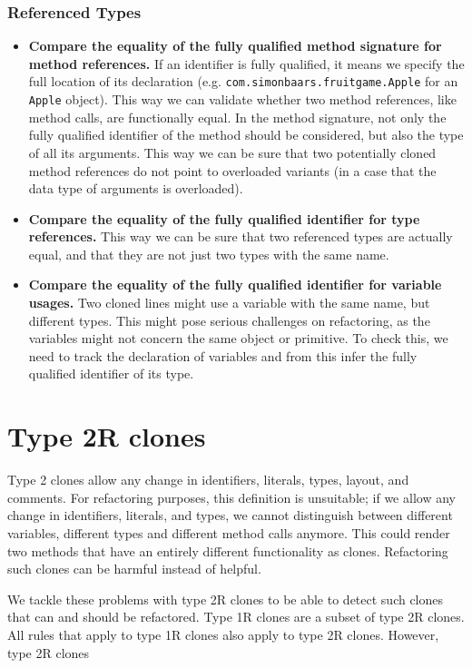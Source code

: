 \subsubsection{Referenced Types}


\begin{itemize}
  \item \textbf{Compare the equality of the fully qualified method signature for method references.} If an identifier is fully qualified, it means we specify the full location of its declaration (e.g. \texttt{com.simonbaars.fruitgame.Apple} for an \texttt{Apple} object). This way we can validate whether two method references, like method calls, are functionally equal. In the method signature, not only the fully qualified identifier of the method should be considered, but also the type of all its arguments. This way we can be sure that two potentially cloned method references do not point to overloaded variants (in a case that the data type of arguments is overloaded).
  \item \textbf{Compare the equality of the fully qualified identifier for type references.} This way we can be sure that two referenced types are actually equal, and that they are not just two types with the same name.
  \item \textbf{Compare the equality of the fully qualified identifier for variable usages.} Two cloned lines might use a variable with the same name, but different types. This might pose serious challenges on refactoring, as the variables might not concern the same object or primitive. To check this, we need to track the declaration of variables and from this infer the fully qualified identifier of its type.
\end{itemize}

\section{Type 2R clones}
Type 2 clones allow any change in identifiers, literals, types, layout, and comments. For refactoring purposes, this definition is unsuitable; if we allow any change in identifiers, literals, and types, we cannot distinguish between different variables, different types and different method calls anymore. This could render two methods that have an entirely different functionality as clones. Refactoring such clones can be harmful instead of helpful.

We tackle these problems with type 2R clones to be able to detect such clones that can and should be refactored. Type 1R clones are a subset of type 2R clones. All rules that apply to type 1R clones also apply to type 2R clones. However, type 2R clones

